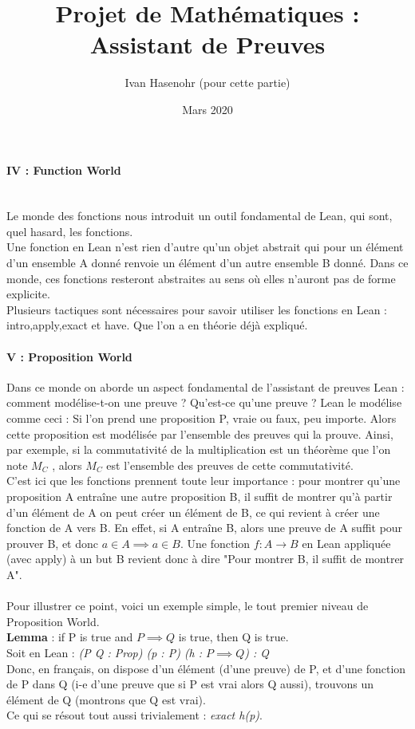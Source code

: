 \documentclass[french,frenchkw]{article}
\title{Projet de Mathématiques : Assistant de Preuves}
\author{Ivan Hasenohr (pour cette partie)}
\date{Mars 2020}
\begin{document}
\maketitle

\paragraph{IV : Function World}
\\
Le monde des fonctions nous introduit un outil fondamental de Lean, qui sont, quel hasard, les fonctions. \\
Une fonction en Lean n'est rien d'autre qu'un objet abstrait qui pour un élément d'un ensemble A donné renvoie un élément d'un autre ensemble B donné. Dans ce monde, ces fonctions resteront abstraites au sens où elles n'auront pas de forme explicite. \\
Plusieurs tactiques sont nécessaires pour savoir utiliser les fonctions en Lean : intro,apply,exact et have. Que l'on a en théorie déjà expliqué.\\

\paragraph{V : Proposition World} 
Dans ce monde on aborde un aspect fondamental de l'assistant de preuves Lean : comment modélise-t-on une preuve ? Qu'est-ce qu'une preuve ? Lean le modélise comme ceci : Si l'on prend une proposition P, vraie ou faux, peu importe. Alors cette proposition est modélisée par l'ensemble des preuves qui la prouve. Ainsi, par exemple, si la commutativité de la multiplication est un théorème que l'on note $M_C$ , alors $M_C$ est l'ensemble des preuves de cette commutativité.\\
C'est ici que les fonctions prennent toute leur importance : pour montrer qu'une proposition A entraîne une autre proposition B, il suffit de montrer qu'à partir d'un élément de A on peut créer un élément de B, ce qui revient à créer une fonction de A vers B. En effet, si A entraîne B, alors une preuve de A suffit pour prouver B, et donc $a \in A \implies a \in B$. Une fonction $f : A \xrightarrow{} B$ en Lean appliquée (avec apply) à un but B revient donc à dire "Pour montrer B, il suffit de montrer A".\\
\\
Pour illustrer ce point, voici un exemple simple, le tout premier niveau de Proposition World. \\
\textbf{Lemma} : if P is true and $P \implies Q$ is true, then Q is true. \\
Soit en Lean : \textit{(P Q : Prop) (p : P) (h : $P \implies Q$) : Q} \\
Donc, en français, on dispose d'un élément (d'une preuve) de P, et d'une fonction de P dans Q (i-e d'une preuve que si P est vrai alors Q aussi), trouvons un élément de Q (montrons que Q est vrai). \\
Ce qui se résout tout aussi trivialement : \textit{exact h(p)}.


\end{document}
